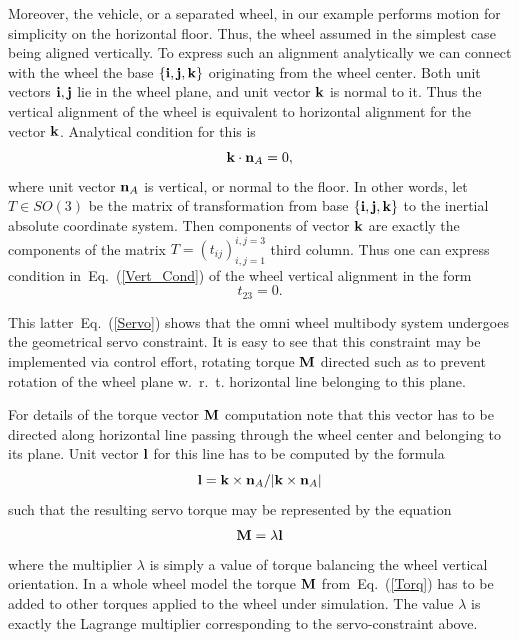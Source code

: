 \documentclass{jsme-tj}
\begin{document}
Moreover, the vehicle, or a separated wheel, in our example performs motion for 
simplicity on the horizontal floor. Thus, the wheel assumed in the simplest 
case being aligned vertically. To express such an alignment analytically we can 
connect with the wheel the base $\{ {\bf i},{\bf j},{\bf k}\} $ originating 
from the wheel center. Both unit vectors ${\bf i},{\bf j}$ lie in the wheel 
plane, and unit vector ${\bf k}$ is normal to it. Thus the vertical alignment 
of the wheel is equivalent to horizontal alignment for the vector ${\bf k}$. 
Analytical condition for this is
\begin{equation}
{\bf k}\cdot {\bf n}_A=0,\label{Vert_Cond}
\end{equation}
where unit vector ${\bf n}_A$ is vertical, or normal to the floor. In other
words, let $T\in SO(3)$ be the matrix of transformation from base 
$\{ {\bf i},{\bf j},{\bf k}\} $ to the inertial absolute coordinate system. 
Then components of vector ${\bf k}$ are exactly the components of the matrix
$T=\left( t_{ij}\right) _{i,j=1}^{i,j=3}$ third column. Thus one can express
condition in~Eq.~(\ref{Vert_Cond}) of the wheel vertical alignment in the form
\begin{equation}
t_{23}=0.\label{Servo}
\end{equation}

This latter~Eq.~(\ref{Servo}) shows that the omni wheel multibody system 
undergoes the geometrical servo constraint. It is easy to see that this 
constraint may be implemented via control effort, rotating torque ${\bf M}$ 
directed such as to prevent rotation of the wheel plane w.~r.~t. horizontal 
line belonging to this plane.

For details of the torque vector ${\bf M}$ computation note that this vector
has to be directed along horizontal line passing through the wheel center and
belonging to its plane. Unit vector ${\bf l}$ for this line has to be computed
by the formula
\begin{equation}
{\bf l}={\bf k}\times {\bf n}_A/|{\bf k}\times {\bf n}_A|
\end{equation}
such that the resulting servo torque may be represented by the equation
\begin{equation}
{\bf M}=\lambda {\bf l}\label{Torq}
\end{equation}
where the multiplier $\lambda $ is simply a value of torque balancing the 
wheel vertical orientation. In a whole wheel model the torque ${\bf M}$ 
from~Eq.~(\ref{Torq}) has to be added to other torques applied to the wheel 
under simulation. The value $\lambda $ is exactly the Lagrange multiplier 
corresponding to the servo-constraint above.
\end{document}

